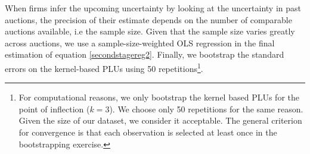 %
%
%
%
%


When firms infer the upcoming uncertainty by looking at the uncertainty in past auctions, the precision of their estimate depends on the number of comparable auctions available, i.e the sample size. Given that the sample size varies greatly across auctions, we use a sample-size-weighted OLS regression in the final estimation of equation \ref{secondstagereg2}. Finally, we bootstrap the standard errors on the kernel-based PLUs using 50 repetitions\footnote{For computational reasons, we only bootstrap the kernel based PLUs for the point of inflection ($k=3$). We choose only 50 repetitions for the same reason. Given the size of our dataset, we consider it acceptable.  The general criterion for convergence is that each observation is selected at least once in the bootstrapping exercise.}.\\


